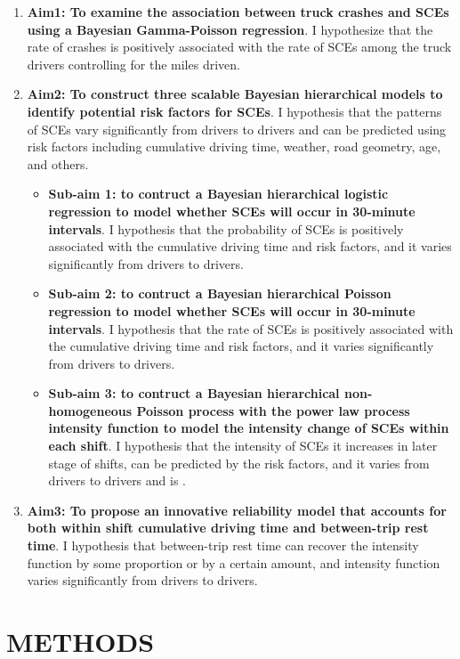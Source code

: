 \documentclass[12pt]{book}
\numberwithin{equation}{chapter}
\providecommand{\tightlist}{%
  \setlength{\itemsep}{0pt}\setlength{\parskip}{0pt}}
\begin{document}
\begin{enumerate}
\def\labelenumi{\arabic{enumi}.}
\item
  \textbf{Aim1: To examine the association between truck crashes and SCEs using a Bayesian Gamma-Poisson regression}. I hypothesize that the rate of crashes is positively associated with the rate of SCEs among the truck drivers controlling for the miles driven.
\item
  \textbf{Aim2: To construct three scalable Bayesian hierarchical models to identify potential risk factors for SCEs}. I hypothesis that the patterns of SCEs vary significantly from drivers to drivers and can be predicted using risk factors including cumulative driving time, weather, road geometry, age, and others.

  \begin{itemize}
  \tightlist
  \item
    \textbf{Sub-aim 1: to contruct a Bayesian hierarchical logistic regression to model whether SCEs will occur in 30-minute intervals}. I hypothesis that the probability of SCEs is positively associated with the cumulative driving time and risk factors, and it varies significantly from drivers to drivers.
  \item
    \textbf{Sub-aim 2: to contruct a Bayesian hierarchical Poisson regression to model whether SCEs will occur in 30-minute intervals}. I hypothesis that the rate of SCEs is positively associated with the cumulative driving time and risk factors, and it varies significantly from drivers to drivers.
  \item
    \textbf{Sub-aim 3: to contruct a Bayesian hierarchical non-homogeneous Poisson process with the power law process intensity function to model the intensity change of SCEs within each shift}. I hypothesis that the intensity of SCEs it increases in later stage of shifts, can be predicted by the risk factors, and it varies from drivers to drivers and is .
  \end{itemize}
\item
  \textbf{Aim3: To propose an innovative reliability model that accounts for both within shift cumulative driving time and between-trip rest time}. I hypothesis that between-trip rest time can recover the intensity function by some proportion or by a certain amount, and intensity function varies significantly from drivers to drivers.
\end{enumerate}

\hypertarget{methods}{%
\chapter{METHODS}\label{methods}}
\end{document}
